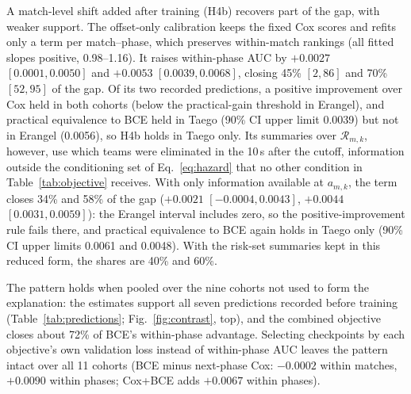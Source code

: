 \documentclass[sigconf,anonymous]{acmart}
\begin{document}
A match-level shift added after training (H4b) recovers part of the gap, with weaker support. The offset-only calibration keeps the fixed Cox scores and refits only a term per match--phase, which preserves within-match rankings (all fitted slopes positive, 0.98--1.16). It raises within-phase AUC by $+0.0027$ $[0.0001,\allowbreak 0.0050]$ and $+0.0053$ $[0.0039,\allowbreak 0.0068]$, closing 45\% $[2,\allowbreak 86]$ and 70\% $[52,\allowbreak 95]$ of the gap. Of its two recorded predictions, a positive improvement over Cox held in both cohorts (below the practical-gain threshold in Erangel), and practical equivalence to BCE held in Taego (90\% CI upper limit 0.0039) but not in Erangel (0.0056), so H4b holds in Taego only. Its summaries over $\mathcal{R}_{m,k}$, however, use which teams were eliminated in the 10\,s after the cutoff, information outside the conditioning set of Eq.~\eqref{eq:hazard} that no other condition in Table~\ref{tab:objective} receives. With only information available at $a_{m,k}$, the term closes 34\% and 58\% of the gap ($+0.0021$ $[-0.0004,\allowbreak 0.0043]$, $+0.0044$ $[0.0031,\allowbreak 0.0059]$): the Erangel interval includes zero, so the positive-improvement rule fails there, and practical equivalence to BCE again holds in Taego only (90\% CI upper limits 0.0061 and 0.0048). With the risk-set summaries kept in this reduced form, the shares are 40\% and 60\%.


The pattern holds when pooled over the nine cohorts not used to form the explanation: the estimates support all seven predictions recorded before training (Table~\ref{tab:predictions}; Fig.~\ref{fig:contrast}, top), and the combined objective closes about 72\% of BCE's within-phase advantage. Selecting checkpoints by each objective's own validation loss instead of within-phase AUC leaves the pattern intact over all 11 cohorts (BCE minus next-phase Cox: $-0.0002$ within matches, $+0.0090$ within phases; Cox+BCE adds $+0.0067$ within phases).
\end{document}
